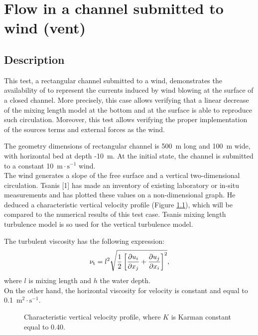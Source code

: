 \chapter{Flow in a channel submitted to wind (vent)}

\section{Description}

\bigskip
This test, a rectangular channel submitted to a wind,
demonstrates the availability of  to represent the currents
induced by wind blowing at the surface of a closed channel.
More precisely, this case allows verifying that a linear decrease of the mixing
length model at the bottom and at the surface is able to reproduce such circulation.
Moreover, this test allows verifying the proper implementation of the sources terms
and external forces as the wind.

\bigskip
The geometry dimensions of rectangular channel is 500~m long and 100~m wide,
 with horizontal bed at depth -10~m. At the initial state, the channel is submitted
 to a constant 10~$\text{m}\cdot\text{s}^{-1}$ wind. \\
The wind generates a slope of the free surface and a vertical two-dimensional circulation.
Tsanis [1] has made an inventory of existing laboratory or in-situ
measurements and has plotted these values on a non-dimensional graph.
He deduced a characteristic vertical velocity profile
(Figure \ref{t3d:vent:fig:mixinglength}), which will be compared to
the numerical results of this test case.
Tsanis mixing length turbulence model is so used for the vertical turbulence model.

The turbulent viscosity has the following expression:
\begin{equation*}
\nu_{\rm{t}} = l^2 \sqrt{\frac{1}{2}\left[ \frac{\partial u_i}{\partial x_j}
 + \frac{\partial u_j}{\partial x_i} \right]^2},
\end{equation*}
where $l$ is mixing length and $h$ the water depth.\\
On the other hand, the horizontal viscosity for velocity is constant and equal
to 0.1~$\text{m}^2\cdot\text{s}^{-1}$.

\begin{figure}[!htbp]
 \centering
 \caption{Characteristic vertical velocity profile,
 where $K$ is Karman constant equal to 0.40.}
 \label{t3d:vent:fig:mixinglength}
\end{figure}

